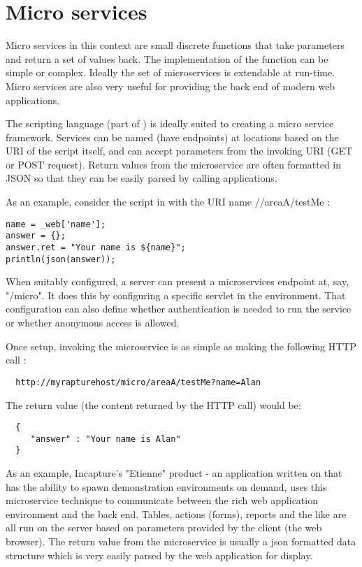 \section{Micro services}
Micro services in this context are small discrete functions that take parameters and return a set of values back. The implementation of the function can be simple or
complex. Ideally the set of microservices is extendable at run-time. Micro services are also very useful for providing the back end of modern web applications.

The \Reflex scripting language (part of \Rapture) is ideally suited to creating a micro service framework. Services can be named (have endpoints) at locations based on the URI
of the script itself, and can accept parameters from the invoking URI (GET or POST request). Return values from the microservice are often formatted in JSON so that they
can be easily parsed by calling applications.

As an example, consider the script in \Rapture with the URI name //areaA/testMe :

\begin{lstlisting}
name = _web['name'];
answer = {};
answer.ret = "Your name is ${name}";
println(json(answer));
\end{lstlisting}

When suitably configured, a \Rapture server can present a microservices endpoint at, say, "/micro". It does this by configuring a specific servlet in the
\Rapture environment. That configuration can also define whether authentication is needed to run the service or whether anonymous access is allowed.

Once setup, invoking the microservice is as simple as making the following HTTP call :

\begin{Verbatim}
  http://myrapturehost/micro/areaA/testMe?name=Alan
\end{Verbatim}

The return value (the content returned by the HTTP call) would be:

\begin{Verbatim}
  {
     "answer" : "Your name is Alan"
  }
\end{Verbatim}

As an example, Incapture's "Etienne" product - an application written on \Rapture that has the ability to spawn \Rapture demonstration environments on demand, uses
this microservice technique to communicate between the rich web application environment and the \Rapture back end. Tables, actions (forms), reports and the like are
all run on the server based on parameters provided by the client (the web browser). The return value from the microservice is usually a json formatted data structure
which is very easily parsed by the web application for display.
